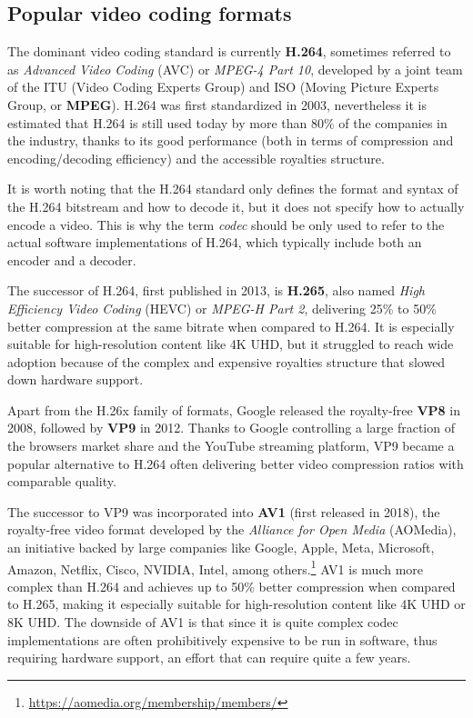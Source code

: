 \subsection{Popular video coding formats}
\label{sec:bg/compression/codecs}

The dominant video coding standard is currently \textbf{H.264}, sometimes referred to as \textit{Advanced Video Coding} (AVC) or \textit{MPEG-4 Part 10}, developed by a joint team of the ITU (Video Coding Experts Group) and ISO (Moving Picture Experts Group, or \textbf{MPEG}). H.264 was first standardized in 2003, nevertheless it is estimated that H.264 is still used today by more than 80\% of the companies in the industry, thanks to its good performance (both in terms of compression and encoding/decoding efficiency) and the accessible royalties structure.\cite{bitmovin}

It is worth noting that the H.264 standard only defines the format and syntax of the H.264 bitstream and how to decode it, but it does not specify how to actually encode a video. This is why the term \textit{codec} should be only used to refer to the actual software implementations of H.264, which typically include both an encoder and a decoder.

The successor of H.264, first published in 2013, is \textbf{H.265}, also named \textit{High Efficiency Video Coding} (HEVC) or \textit{MPEG-H Part 2}, delivering 25\% to 50\% better compression at the same bitrate when compared to H.264. It is especially suitable for high-resolution content like 4K UHD, but it struggled to reach wide adoption because of the complex and expensive royalties structure that slowed down hardware support.\cite{hevcroyalties}

Apart from the H.26x family of formats, Google released the royalty-free \textbf{VP8} in 2008, followed by \textbf{VP9} in 2012. Thanks to Google controlling a large fraction of the browsers market share and the YouTube streaming platform, VP9 became a popular alternative to H.264 often delivering better video compression ratios with comparable quality.


The successor to VP9 was incorporated into \textbf{AV1} (first released in 2018), the royalty-free video format developed by the \textit{Alliance for Open Media} (AOMedia), an initiative backed by large companies like Google, Apple, Meta, Microsoft, Amazon, Netflix, Cisco, NVIDIA, Intel, among others.\footnote{\url{https://aomedia.org/membership/members/}} AV1 is much more complex than H.264 and achieves up to 50\% better compression when compared to H.265, making it especially suitable for high-resolution content like 4K UHD or 8K UHD. The downside of AV1 is that since it is quite complex codec implementations are often prohibitively expensive to be run in software, thus requiring hardware support, an effort that can require quite a few years.

